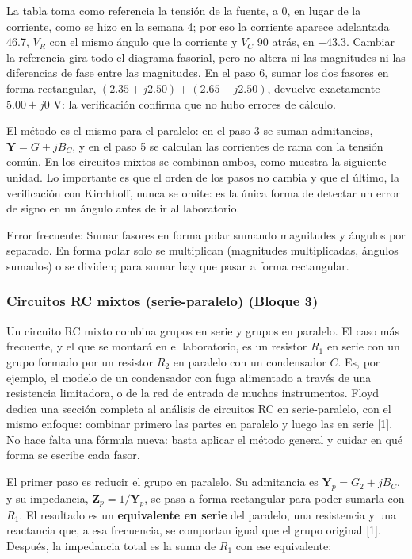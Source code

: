 \documentclass[11pt,letterpaper]{article}
\begin{document}
La tabla toma como referencia la tensión de la fuente, a 0\textdegree{}, en lugar de la corriente, como se hizo en la semana 4; por eso la corriente aparece adelantada 46.7\textdegree{}, $V_R$ con el mismo ángulo que la corriente y $V_C$ 90\textdegree{} atrás, en \ensuremath{-}43.3\textdegree{}. Cambiar la referencia gira todo el diagrama fasorial, pero no altera ni las magnitudes ni las diferencias de fase entre las magnitudes. En el paso 6, sumar los dos fasores en forma rectangular, $(2.35 + j2.50) + (2.65 - j2.50)$, devuelve exactamente $5.00 + j0$ V: la verificación confirma que no hubo errores de cálculo.

El método es el mismo para el paralelo: en el paso 3 se suman admitancias, $\mathbf{Y} = G + jB_C$, y en el paso 5 se calculan las corrientes de rama con la tensión común. En los circuitos mixtos se combinan ambos, como muestra la siguiente unidad. Lo importante es que el orden de los pasos no cambia y que el último, la verificación con Kirchhoff, nunca se omite: es la única forma de detectar un error de signo en un ángulo antes de ir al laboratorio.

\begin{nota}{Error frecuente:}
Sumar fasores en forma polar sumando magnitudes y ángulos por separado. En forma polar solo se multiplican (magnitudes multiplicadas, ángulos sumados) o se dividen; para sumar hay que pasar a forma rectangular.
\end{nota}

\subsubsection{Circuitos RC mixtos (serie-paralelo) (Bloque 3)}

Un circuito RC mixto combina grupos en serie y grupos en paralelo. El caso más frecuente, y el que se montará en el laboratorio, es un resistor $R_1$ en serie con un grupo formado por un resistor $R_2$ en paralelo con un condensador $C$. Es, por ejemplo, el modelo de un condensador con fuga alimentado a través de una resistencia limitadora, o de la red de entrada de muchos instrumentos. Floyd dedica una sección completa al análisis de circuitos RC en serie-paralelo, con el mismo enfoque: combinar primero las partes en paralelo y luego las en serie [1]. No hace falta una fórmula nueva: basta aplicar el método general y cuidar en qué forma se escribe cada fasor.

El primer paso es reducir el grupo en paralelo. Su admitancia es $\mathbf{Y}_p = G_2 + jB_C$, y su impedancia, $\mathbf{Z}_p = 1/\mathbf{Y}_p$, se pasa a forma rectangular para poder sumarla con $R_1$. El resultado es un \textbf{equivalente en serie} del paralelo, una resistencia y una reactancia que, a esa frecuencia, se comportan igual que el grupo original [1]. Después, la impedancia total es la suma de $R_1$ con ese equivalente:
\end{document}
